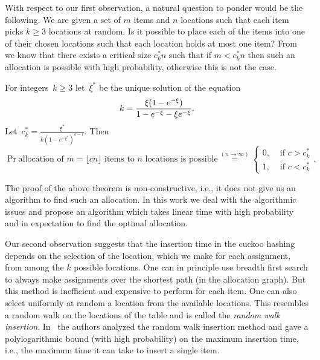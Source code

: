 With respect to our first observation, a natural question to ponder would be the following. We are given a set of $m$ items and $n$ locations such that each item picks $k\ge 3$ locations at random. Is it possible to place each of the items into one of their chosen locations such that each location holds at most one item? From~ \cite{inp:l12,fp12,fm12} we know that there exists a critical size $c_k^* n$ such that if $m<c_k^* n$ then such an allocation is possible with high probability, otherwise this is not the case.


\begin{theorem}
\label{thm:mainO}
For integers~$k\geq 3$ let~$\xi^\ast$ be the unique solution of the equation
\begin{equation}\label{eq:kxi}
 k = {\xi(1-e^{-\xi})\over 1-e^{-\xi} -\xi e^{-\xi} }.
\end{equation}
Let~$c_{k}^\ast= \frac{\xi^\ast}{k(1-e^{-\xi^{*}})^{k-1}}$. Then
\begin{equation}
\label{eq:phnmkl}
	\Pr{\text{allocation of $m=\lfloor cn\rfloor$ items to $n$ locations is possible}}
	\stackrel{(n \to \infty)}{=} 
	\begin{cases}
		0, & \text{ if } c > c_{k}^\ast \\
		1, & \text{ if } c < c_{k}^\ast
	\end{cases}.
\end{equation}
\end{theorem}

The proof of the above theorem is non-constructive, i.e., it does not give us an algorithm to find such an allocation. In this work we deal with the algorithmic issues and propose an algorithm which takes linear time with high probability and in expectation to find the optimal allocation.

Our second observation suggests that the insertion time in the cuckoo hashing depends on the selection of the location, which we make for each assignment, from among the $k$ possible locations. One can in principle use breadth first search to  always make assignments over the shortest path (in the allocation graph). But this method is inefficient and expensive to perform for each item. One can also select uniformly at random a location from the available locations. This resembles a random walk on the locations of the table and is called the \emph{random walk insertion}. In~\cite{art:fps10,art:fmm11} the authors analyzed the random walk insertion method and gave a polylogarithmic bound (with high probability) on the maximum insertion time, i.e., the maximum time it can take to insert a single item.  



